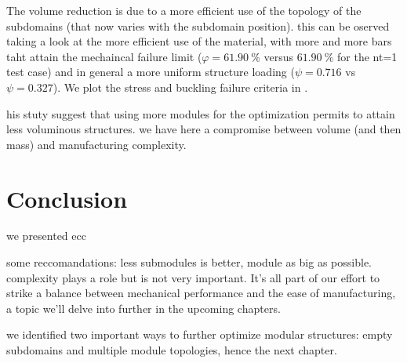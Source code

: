     The volume reduction is due to a more efficient use of the topology of the subdomains (that now varies with the subdomain position). this can be oserved taking a look at the more efficient use of the material, with more and more bars taht attain the mechaincal failure limit ($\varphi = \qty{61.90}{\percent}$ versus $\qty{61.90}{\percent}$ for the nt=1 test case) and in general a more uniform structure loading ($\psi=0.716$ vs $\psi=0.327$). We plot the stress and buckling failure criteria in .
    
    his stuty suggest that using more modules for the optimization permits to attain less voluminous structures. we have here a compromise between volume (and then mass) and manufacturing complexity. 


\section{Conclusion}
we presented ecc

some reccomandations: less submodules is better, module as big as possible. complexity plays a role but is not very important.
It's all part of our effort to strike a balance between mechanical performance and the ease of manufacturing, a topic we'll delve into further in the upcoming chapters.

we identified two important ways to further optimize modular structures: empty subdomains and multiple module topologies, hence the next chapter.